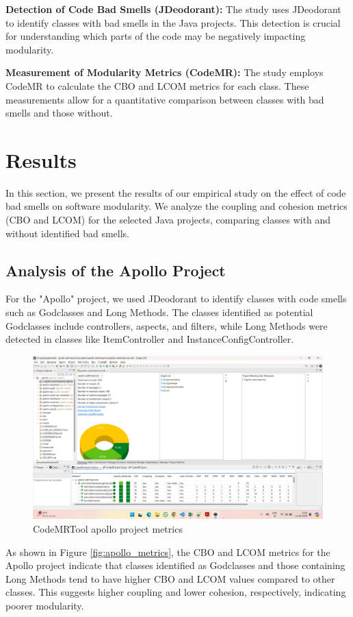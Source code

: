 \documentclass[conference]{IEEEtran}
\begin{document}
\textbf{Detection of Code Bad Smells (JDeodorant):} The study uses JDeodorant to identify classes with bad smells in the Java projects. This detection is crucial for understanding which parts of the code may be negatively impacting modularity.

\textbf{Measurement of Modularity Metrics (CodeMR):} The study employs CodeMR to calculate the CBO and LCOM metrics for each class. These measurements allow for a quantitative comparison between classes with bad smells and those without.

	
	\section{Results}

In this section, we present the results of our empirical study on the effect of code bad smells on software modularity. We analyze the coupling and cohesion metrics (CBO and LCOM) for the selected Java projects, comparing classes with and without identified bad smells.

\subsection{Analysis of the Apollo Project}

For the "Apollo" project, we used JDeodorant to identify classes with code smells such as Godclasses and Long Methods. The classes identified as potential Godclasses include controllers, aspects, and filters, while Long Methods were detected in classes like ItemController and InstanceConfigController.

\begin{figure}
        \centering
        \includegraphics[width=0.75\linewidth]{apollo-output-CodeMRTool.png}
        \caption{CodeMRTool apollo project metrics}
        \label{fig:enter-label}
    \end{figure}

As shown in Figure \ref{fig:apollo_metrics}, the CBO and LCOM metrics for the Apollo project indicate that classes identified as Godclasses and those containing Long Methods tend to have higher CBO and LCOM values compared to other classes. This suggests higher coupling and lower cohesion, respectively, indicating poorer modularity.
\end{document}
